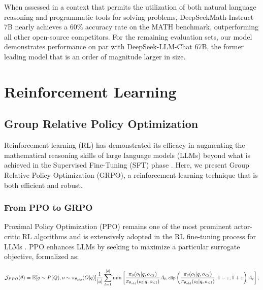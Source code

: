 \begin{itemize}[topsep=0pt]
\begin{itemize}[topsep=0pt]
When assessed in a context that permits the utilization of both natural language reasoning and programmatic tools for solving problems, DeepSeekMath-Instruct 7B nearly achieves a 60\% accuracy rate on the MATH benchmark, outperforming all other open-source competitors. For the remaining evaluation sets, our model demonstrates performance on par with DeepSeek-LLM-Chat 67B, the former leading model that is an order of magnitude larger in size.

\section{Reinforcement Learning}

\subsection{Group Relative Policy Optimization} Reinforcement learning (RL) has demonstrated its efficacy in augmenting the mathematical reasoning skills of large language models (LLMs) beyond what is achieved in the Supervised Fine-Tuning (SFT) phase \citep{wang2023math,wizardmath}. Here, we present Group Relative Policy Optimization (GRPO), a reinforcement learning technique that is both efficient and robust.

\subsubsection{From PPO to GRPO} Proximal Policy Optimization (PPO) \citep{schulman2017proximal} remains one of the most prominent actor-critic RL algorithms and is extensively adopted in the RL fine-tuning process for LLMs \citep{ouyang2022training}. PPO enhances LLMs by seeking to maximize a particular surrogate objective, formalized as:

\begin{equation}
\footnotesize
    \mathcal{J}_{PPO}(\theta) = \mathbb{E}{[q \sim P(Q), o \sim \pi_{\theta_{old}}(O|q)]} \frac{1}{|o|} \sum_{t=1}^{|o|} \min \left[ \frac{\pi_\theta(o_{t} | q, o_{<t})}{\pi_{\theta_{old}}(o_{t} | q, o_{<t})} A_{t}, \text{clip} \left( \frac{\pi_\theta(o_{t} | q, o_{<t})}{\pi_{\theta_{old}}(o_{t} | q, o_{<t})}, 1 - \varepsilon, 1 + \varepsilon \right)  A_{t} \right] ,
\end{equation}


\end{itemize}
\end{itemize}
